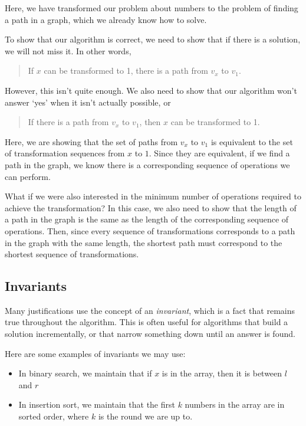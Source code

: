 \documentclass[12pt]{article}
\begin{document}
\begin{question}
Here, we have transformed our problem about numbers to the problem of finding a path in a graph, which we already know how to solve.

To show that our algorithm is correct, we need to show that if there is a solution, we will not miss it. In other words, \begin{quote}
    If $x$ can be transformed to 1, there is a path from $v_x$ to $v_1$.
\end{quote}
However, this isn't quite enough. We also need to show that our algorithm won't answer `yes' when it isn't actually possible, or \begin{quote}
    If there is a path from $v_x$ to $v_1$, then $x$ can be transformed to 1.
\end{quote}
Here, we are showing that the set of paths from $v_x$ to $v_1$ is equivalent to the set of transformation sequences from $x$ to $1$. Since they are equivalent, if we find a path in the graph, we know there is a corresponding sequence of operations we can perform.

What if we were also interested in the minimum number of operations required to achieve the transformation? In this case, we also need to show that the length of a path in the graph is the same as the length of the corresponding sequence of operations. Then, since every sequence of transformations corresponds to a path in the graph with the same length, the shortest path must correspond to the shortest sequence of transformations.
\subsection*{Invariants}
Many justifications use the concept of an \textit{invariant}, which is a fact that remains true throughout the algorithm. This is often useful for algorithms that build a solution incrementally, or that narrow something down until an answer is found.

Here are some examples of invariants we may use:
\begin{itemize}
    \item In binary search, we maintain that if $x$ is in the array, then it is between $l$ and $r$
    \item In insertion sort, we maintain that the first $k$ numbers in the array are in sorted order, where $k$ is the round we are up to. 
\end{itemize}


\end{question}
\end{document}
